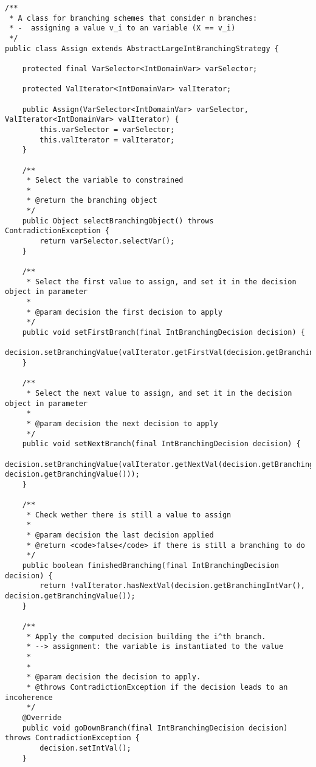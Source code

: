 \begin{lstlisting}   
/**
 * A class for branching schemes that consider n branches: 
 * -  assigning a value v_i to an variable (X == v_i)
 */
public class Assign extends AbstractLargeIntBranchingStrategy {

    protected final VarSelector<IntDomainVar> varSelector;

    protected ValIterator<IntDomainVar> valIterator;

    public Assign(VarSelector<IntDomainVar> varSelector, ValIterator<IntDomainVar> valIterator) {
        this.varSelector = varSelector;
        this.valIterator = valIterator;
    }

    /**
     * Select the variable to constrained
     *
     * @return the branching object
     */
    public Object selectBranchingObject() throws ContradictionException {
        return varSelector.selectVar();
    }

    /**
     * Select the first value to assign, and set it in the decision object in parameter
     *
     * @param decision the first decision to apply
     */
    public void setFirstBranch(final IntBranchingDecision decision) {
        decision.setBranchingValue(valIterator.getFirstVal(decision.getBranchingIntVar()));
    }

    /**
     * Select the next value to assign, and set it in the decision object in parameter
     *
     * @param decision the next decision to apply
     */
    public void setNextBranch(final IntBranchingDecision decision) {
        decision.setBranchingValue(valIterator.getNextVal(decision.getBranchingIntVar(), decision.getBranchingValue()));
    }

    /**
     * Check wether there is still a value to assign
     *
     * @param decision the last decision applied
     * @return <code>false</code> if there is still a branching to do
     */
    public boolean finishedBranching(final IntBranchingDecision decision) {
        return !valIterator.hasNextVal(decision.getBranchingIntVar(), decision.getBranchingValue());
    }

    /**
     * Apply the computed decision building the i^th branch.
     * --> assignment: the variable is instantiated to the value
     * 
     * 
     * @param decision the decision to apply.
     * @throws ContradictionException if the decision leads to an incoherence
     */
    @Override
    public void goDownBranch(final IntBranchingDecision decision) throws ContradictionException {
        decision.setIntVal();
    }


\end{lstlisting}
